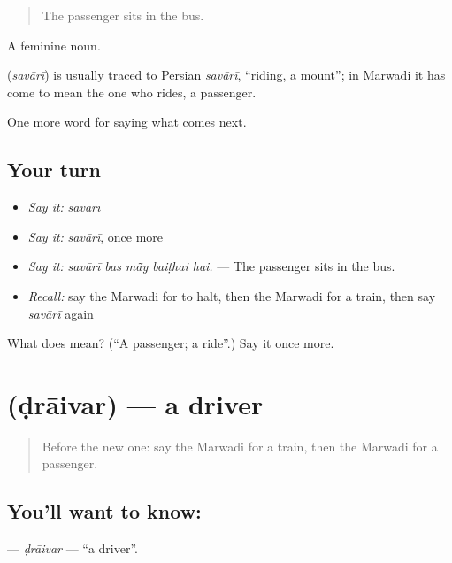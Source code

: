 \begin{quote}
The passenger sits in the bus.
\end{quote}

A feminine noun.

\begin{cousinweb}
\textbf{} (\emph{savārī}) is usually traced to Persian \emph{savārī}, \textquotedblleft{}riding, a mount\textquotedblright{}; in Marwadi it has come to mean the one who rides, a passenger.
\end{cousinweb}

\begin{grammarlens}[title={What you've built}]
One more word for saying what comes next.
\end{grammarlens}

\subsection*{Your turn}
\begin{itemize}
\raggedright
  \item \emph{Say it:} \emph{savārī}
  \item \emph{Say it:} \emph{savārī}, once more
  \item \emph{Say it:} \emph{savārī bas mā̃y baiṭhai hai.} — The passenger sits in the bus.
  \item \emph{Recall:} say the Marwadi for to halt, then the Marwadi for a train, then say \emph{savārī} again
\end{itemize}

\begin{tcolorbox}[breakable,colback=teal!4,colframe=teal!35!black,title={Before you move on}]
What does  mean? (\textquotedblleft{}A passenger; a ride\textquotedblright{}.) Say it once more.
\end{tcolorbox}
\section[\texorpdfstring{\mw{ड्राइवर} (ḍrāivar)}{ड्राइवर (ḍrāivar)}]{ (ḍrāivar) — a driver}

\label{lesson:MW-C218-draivar}



\begin{quote}
Before the new one: say the Marwadi for a train, then the Marwadi for a passenger.
\end{quote}

\subsection*{You'll want to know: }
\textbf{} — \emph{ḍrāivar} — \textquotedblleft{}a driver\textquotedblright{}.


